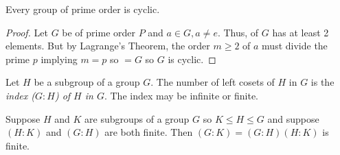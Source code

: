 \begin{corollary}
    Every group of prime order is cyclic.
\end{corollary}
\begin{proof}
    Let $G$ be of prime order $P$ and $a \in G, a \neq e$. Thus,  of $G$ has at least 2 elements. But by Lagrange's Theorem, the order $m \geq 2$ of $a$ must divide the prime $p$ implying $m = p$ so  $= G$ so $G$ is cyclic.
\end{proof}
\begin{definition}
    Let $H$ be a subgroup of a group $G$. The number of left cosets of $H$ in $G$ is the \emph{index ($G:H$) of $H$ in $G$}. The index may be infinite or finite.
\end{definition}
\begin{theorem}
    Suppose $H$ and $K$ are subgroups of a group $G$ so $K\leq H \leq G$ and suppose $(H:K)$ and $(G:H)$ are both finite. Then $(G:K) = (G:H)(H:K)$ is finite.
\end{theorem}


